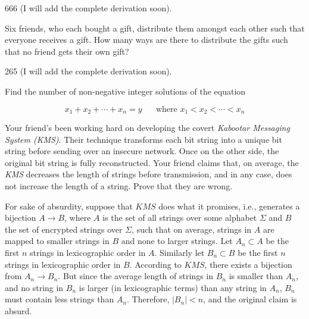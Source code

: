 \documentclass[addpoints]{exam}
\begin{document}
\begin{questions}
  \begin{solution}
    666  (I will add the complete derivation soon).
  \end{solution}
  
\question 
Six friends, who each bought a gift, distribute them amongst each other such that everyone receives a gift. How many ways are there to distribute the gifts such that no friend gets their own gift?



  \begin{solution}
   265 (I will add the complete derivation soon).
  \end{solution}

\question [0]
Find the number of non-negative integer solutions of the equation

\[x_1 + x_2 + \cdots + x_n = y \;\;\;\;\;\;\text{where } x_1 < x_2 < \cdots < x_n\]

\question 
Your friend's been working hard on developing the covert \textit{Kabootar Messaging System (KMS)}. Their technique transforms each bit string into a unique bit string before sending over an insecure network. Once on the other side, the original bit string is fully reconstructed. Your friend claims that, on average, the \textit{KMS} decreases the length of strings before transmission, and in any case, does not increase the length of a string. Prove that they are wrong.

 \begin{solution}
	For sake of absurdity, suppose that $KMS$ does what it promises, i.e., generates a bijection $A \rightarrow B$, where $A$ is the set of all strings over some alphabet $\Sigma$ and $B$ the set of encrypted strings over $\Sigma$, such that on average, strings in $A$ are mapped to smaller strings in $B$ and none to larger strings. Let $A_n \subset A$ be the first $n$ strings in lexicographic order in $A$. Similarly let $B_n \subset B$ be the first $n$ strings in lexicographic order in $B$. According to $KMS$, there exists a bijection from $A_n \rightarrow B_n$.  But since the average length of strings in $B_n$ is smaller than $A_n$, and no string in $B_n$ is larger (in lexicographic terms) than any string in $A_n$, $B_n$ must contain less strings than $A_n$. Therefore, $|B_n| < n$, and the original claim is absurd.   
\end{solution}

\end{questions}
\end{document}
